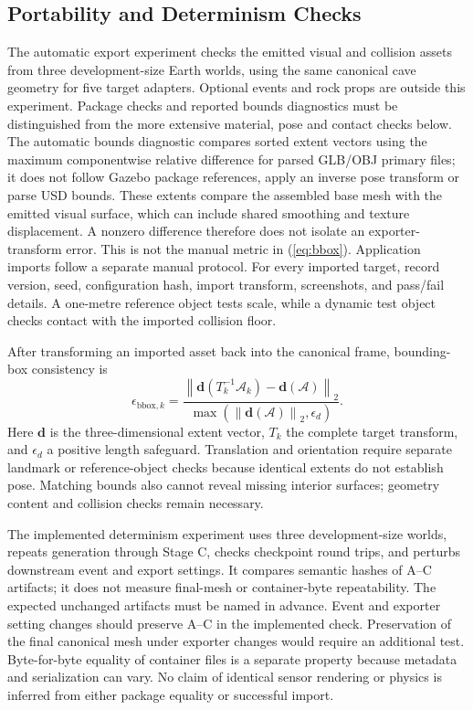 \documentclass[conference]{IEEEtran}
\begin{document}
\subsection{Portability and Determinism Checks}
The automatic export experiment checks the emitted visual and collision assets from three development-size Earth worlds, using the same canonical cave geometry for five target adapters. Optional events and rock props are outside this experiment. Package checks and reported bounds diagnostics must be distinguished from the more extensive material, pose and contact checks below. The automatic bounds diagnostic compares sorted extent vectors using the maximum componentwise relative difference for parsed GLB/OBJ primary files; it does not follow Gazebo package references, apply an inverse pose transform or parse USD bounds. These extents compare the assembled base mesh with the emitted visual surface, which can include shared smoothing and texture displacement. A nonzero difference therefore does not isolate an exporter-transform error. This is not the manual metric in (\ref{eq:bbox}). Application imports follow a separate manual protocol. For every imported target, record version, seed, configuration hash, import transform, screenshots, and pass/fail details. A one-metre reference object tests scale, while a dynamic test object checks contact with the imported collision floor.

After transforming an imported asset back into the canonical frame, bounding-box consistency is
\begin{equation}
\epsilon_{\mathrm{bbox},k}=
\frac{\left\|\mathbf{d}(T_k^{-1}\mathcal{A}_k)-\mathbf{d}(\mathcal{A})\right\|_2}
{\max(\left\|\mathbf{d}(\mathcal{A})\right\|_2,\epsilon_d)}.
\label{eq:bbox}
\end{equation}
Here $\mathbf{d}$ is the three-dimensional extent vector, $T_k$ the complete target transform, and $\epsilon_d$ a positive length safeguard. Translation and orientation require separate landmark or reference-object checks because identical extents do not establish pose. Matching bounds also cannot reveal missing interior surfaces; geometry content and collision checks remain necessary.

The implemented determinism experiment uses three development-size worlds, repeats generation through Stage C, checks checkpoint round trips, and perturbs downstream event and export settings. It compares semantic hashes of A--C artifacts; it does not measure final-mesh or container-byte repeatability. The expected unchanged artifacts must be named in advance. Event and exporter setting changes should preserve A--C in the implemented check. Preservation of the final canonical mesh under exporter changes would require an additional test. Byte-for-byte equality of container files is a separate property because metadata and serialization can vary. No claim of identical sensor rendering or physics is inferred from either package equality or successful import.
\end{document}
